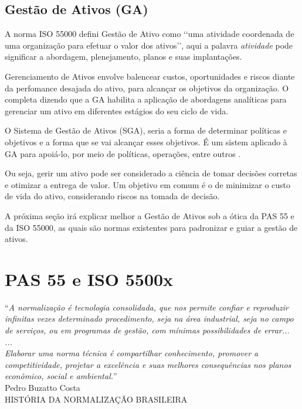 \subsection{Gestão de Ativos (GA)}

A norma ISO 55000 defini Gestão de Ativo como \lq\lq uma atividade coordenada de uma organização para efetuar o valor dos ativos\rq\rq, aqui a palavra \emph{atividade} pode significar a abordagem, plenejamento, planos e suas implantações. 

Gerenciamento de Ativos envolve balencear custos, oportunidades e riscos diante da perfomance desajada do ativo, para alcançar os objetivos da organização. O \cite{iam} completa dizendo que a GA habilita a aplicação de abordagens analíticas para gerenciar um ativo em diferentes estágios do seu ciclo de vida.

O Sistema de Gestão de Ativos (SGA), seria a forma de determinar políticas e objetivos e a forma que se vai alcançar esses objetivos. É um sistem aplicado à GA para apoiá-lo, por meio de políticas, operações, entre outros \cite{abraman}. 

Ou seja, gerir um ativo pode ser considerado a ciência de tomar decisões corretas e otimizar a entrega de valor. Um objetivo em comum é o de minimizar o custo de vida do ativo, considerando riscos na tomada de decisão.

A próxima seção irá explicar melhor a Gestão de Ativos sob a ótica da PAS 55 e da ISO 55000, as quais são normas existentes para padronizar e guiar a gestão de ativos.

\section{PAS 55 e ISO 5500x}

\begin{flushright}
	“\textit{A normalização é tecnologia consolidada, que nos
permite confiar e reproduzir infinitas vezes determinado
procedimento, seja na área industrial, seja no campo de
serviços, ou em programas de gestão, com mínimas
possibilidades de errar...
\\
...
\\
Elaborar uma norma técnica é compartilhar
conhecimento, promover a competitividade, projetar a
excelência e suas melhores consequências nos planos
econômico, social e ambiental.}”
\\
Pedro Buzatto Costa
\\
HISTÓRIA DA NORMALIZAÇÃO BRASILEIRA
\end{flushright}


